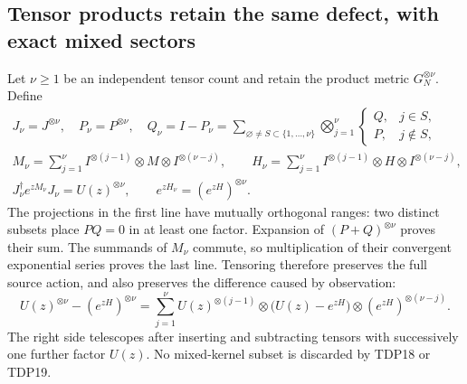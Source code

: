 \documentclass[11pt]{article}
\begin{document}
\subsection{Tensor products retain the same defect, with exact mixed sectors}

Let $\nu\ge1$ be an independent tensor count and retain the product
metric $G_N^{\otimes\nu}$. Define
\begin{equation}\tag{TDP18}
\begin{gathered}
J_\nu=J^{\otimes\nu},\quad P_\nu=P^{\otimes\nu},\quad
Q_\nu=I-P_\nu
 =\sum_{\varnothing\ne S\subset\{1,\ldots,\nu\}}
 \bigotimes_{j=1}^{\nu}\begin{cases}Q,&j\in S,\\P,&j\notin S,
 \end{cases}\\
M_\nu=\sum_{j=1}^\nu I^{\otimes(j-1)}\otimes M\otimes
 I^{\otimes(\nu-j)},\qquad H_\nu=\sum_{j=1}^\nu
 I^{\otimes(j-1)}\otimes H\otimes I^{\otimes(\nu-j)},\\
J_\nu^\dagger e^{zM_\nu}J_\nu=U(z)^{\otimes\nu},\qquad
e^{zH_\nu}=(e^{zH})^{\otimes\nu}.
\end{gathered}
\end{equation}
The projections in the first line have mutually orthogonal ranges:
two distinct subsets place $PQ=0$ in at least one factor. Expansion of
$(P+Q)^{\otimes\nu}$ proves their sum. The summands of $M_\nu$ commute,
so multiplication of their convergent exponential series proves the
last line. Tensoring therefore preserves the full source action, and
also preserves the difference caused by observation:
\begin{equation}\tag{TDP19}
U(z)^{\otimes\nu}-(e^{zH})^{\otimes\nu}
 =\sum_{j=1}^\nu U(z)^{\otimes(j-1)}\otimes
 \bigl(U(z)-e^{zH}\bigr)\otimes(e^{zH})^{\otimes(\nu-j)}.
\end{equation}
The right side telescopes after inserting and subtracting tensors with
successively one further factor $U(z)$. No mixed-kernel subset is
discarded by TDP18 or TDP19.
\end{document}
